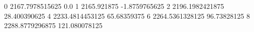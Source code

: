 0 2167.7978515625 0.0
1 2165.921875 -1.8759765625
2 2196.1982421875 28.400390625
4 2233.4814453125 65.68359375
6 2264.5361328125 96.73828125
8 2288.8779296875 121.080078125
